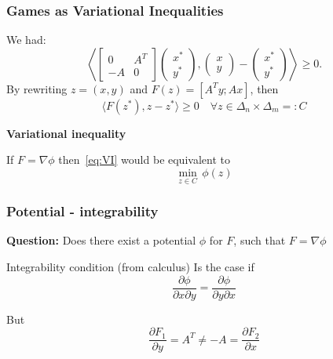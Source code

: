 \documentclass{beamer}
\begin{document}
\begin{frame}
  \frametitle{Games as Variational Inequalities}
  We had:
  \begin{equation}
  \left\langle \begin{bmatrix}
      0 & A^T \\
      -A & 0
    \end{bmatrix}
    \left(\begin{array}{c}
      x^*\\ y^*
    \end{array}  \right),
    \left(\begin{array}{c}
      x \\ y
    \end{array}  \right)
    -
    \left(\begin{array}{c}
      x^* \\
      y^*
    \end{array} \right)
 \right\rangle \ge 0.
  \end{equation}
  By rewriting $z=(x,y)$ and $F(z) = [A^T y; Ax]$, then
  \begin{equation}\tag{VI}
    \label{eq:VI}
    \langle F(z^*), z-z^* \rangle \ge 0 \quad \forall z \in \Delta_n \times \Delta_m =: C
  \end{equation}
  \begin{center}
    \textbf{Variational inequality}
  \end{center}

  \begin{block}{}
  If $F = \nabla \phi$ then~\eqref{eq:VI} would be equivalent to
  \begin{equation}
    \min_{z\in C} \, \phi(z)
  \end{equation}
  \end{block}
\end{frame}

\begin{frame}
  \frametitle{Potential - integrability}

  \textbf{Question:} Does there exist a potential $\phi$ for $F$, such that $F = \nabla \phi$

  \begin{block}{Integrability condition (from calculus)}
    Is the case if
    \begin{equation}
      \frac{\partial \phi}{\partial x \partial y} = \frac{\partial \phi}{\partial y \partial x}
    \end{equation}
  \end{block}
  But
  \begin{equation}
    \frac{\partial F_1}{\partial y} = A^T \neq - A = \frac{\partial F_2}{\partial x}
  \end{equation}
\end{frame}
\end{document}

